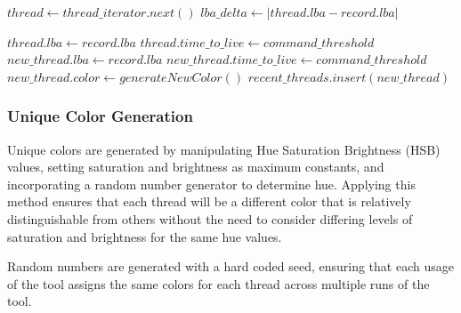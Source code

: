 \documentclass[journal]{vgtc}                %
\begin{document}
\begin{algorithmic}
      \STATE{}
      \STATE $thread \gets thread\_iterator.next()$
      \STATE $lba\_delta\gets |thread.lba - record.lba|$
    \ENDWHILE


     \STATE{}
        \STATE $thread.lba \gets record.lba$
        \STATE $thread.time\_to\_live \gets command\_threshold$
    \ELSE \STATE{}
      \STATE $new\_thread.lba \gets record.lba$
      \STATE $new\_thread.time\_to\_live \gets command\_threshold$
      \STATE $new\_thread.color \gets generateNewColor()$
      \STATE $recent\_threads.insert(new\_thread) $
    \ENDIF


\ENDFOR
\end{algorithmic}

\subsubsection{Unique Color Generation}
Unique colors are generated by manipulating Hue Saturation Brightness (HSB) values, setting saturation and brightness as maximum constants, and incorporating a random number generator to determine hue. Applying this method ensures that each thread will be a different color that is relatively distinguishable from others without the need to consider differing levels of saturation and brightness for the same hue values. 

Random numbers are generated with a hard coded seed, ensuring that each usage of the tool assigns the same colors for each thread across multiple runs of the tool.
\end{document}
